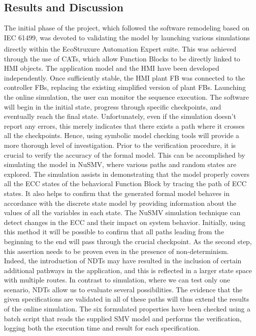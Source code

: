 \begin{bibunit}
\section{Results and Discussion}
\label{sec:results}
The initial phase of the project, which followed the software remodeling based on IEC 61499, was devoted to validating the model by launching various simulations directly within the EcoStruxure\textsuperscript{\texttrademark} Automation Expert suite.
This was achieved through the use of CATs, which allow Function Blocks to be directly linked to HMI objects.
The application model and the HMI have been developed independently. Once sufficiently stable, the HMI plant FB was connected to the controller FBs, replacing the existing simplified version of plant FBs.
Launching the online simulation, the user can monitor the sequence execution. The software will begin in the initial state, progress through specific checkpoints, and eventually reach the final state.
Unfortunately, even if the simulation doesn't report any errors, this merely indicates that there exists a path where it crosses all the checkpoints.
Hence, using symbolic model checking tools will provide a more thorough level of investigation.
Prior to the verification procedure, it is crucial to verify the accuracy of the formal model. This can be accomplished by simulating the model in NuSMV, where various paths and random states are explored.
The simulation assists in demonstrating that the model properly covers all the ECC states of the behavioral Function Block by tracing the path of ECC states. It also helps to confirm that the generated formal model behaves in accordance with the discrete state model by providing information about the values of all the variables in each state.
The NuSMV simulation technique can detect changes in the ECC and their impact on system behavior.
Initially, using this method it will be possible to confirm that all paths leading from the beginning to the end will pass through the crucial checkpoint. As the second step, this assertion needs to be proven even in the presence of non-determinism.
Indeed, the introduction of NDTs may have resulted in the inclusion of certain additional pathways in the application, and this is reflected in a larger state space with multiple routes. In contrast to simulation, where we can test only one scenario, NDTs allow us to evaluate several possibilities. The evidence that the given specifications are validated in all of these paths will thus extend the results of the online simulation. The six formulated properties have been checked using a batch script that reads the supplied SMV model and performs the verification, logging both the execution time and result for each specification. 

\end{bibunit}
